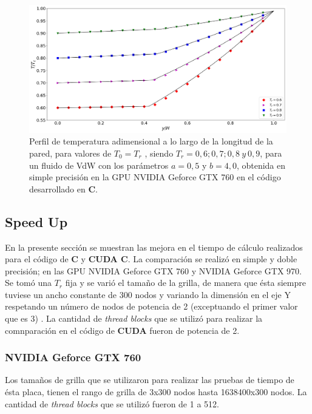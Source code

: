 \begin{figure}[h!]
	\centering
	\includegraphics[width=\textwidth]{figs/cap4/v_760_VdW_c_simple_T_y}
	\caption{Perfil de temperatura adimensional a lo largo de la longitud de la pared, para valores de $T_0 = T_r$ , siendo $T_r = 0,6 ; 0,7 ; 0,8 \>y\> 0,9$, para un fluido de VdW con los parámetros $a = 0,5 $ y $b = 4,0 $, obtenida en simple precisión en la GPU NVIDIA Geforce GTX 760 en el código desarrollado en \textbf{C}.}
	\label{fig:v_760_VdW_c_simple_T_y}	
\end{figure}

\newpage

\subsection{Speed Up}

En la presente sección se muestran las mejora en el tiempo de cálculo realizados para el código de \textbf{C} y \textbf{CUDA C}. La comparación se realizó en simple y doble precisión; en las GPU NVIDIA Geforce GTX 760 y NVIDIA Geforce GTX 970. Se tomó una $T_r$ fija y se varió el tamaño de la grilla, de manera que ésta siempre tuviese un ancho constante de 300 nodos y variando la dimensión en el eje \textsc{Y} respetando un número de nodos de potencia de 2 (exceptuando el primer valor que es 3) . La cantidad de \textit{thread blocks} que se utilizó para realizar la comnparación en el código de \textbf{CUDA} fueron de potencia de 2.

\subsubsection{NVIDIA Geforce GTX 760}

Los tamaños de grilla que se utilizaron para realizar las pruebas de tiempo de ésta placa, tienen el rango de grilla de 3x300 nodos hasta 1638400x300 nodos. La cantidad de \textit{thread blocks} que se utilizó fueron de 1 a 512.

